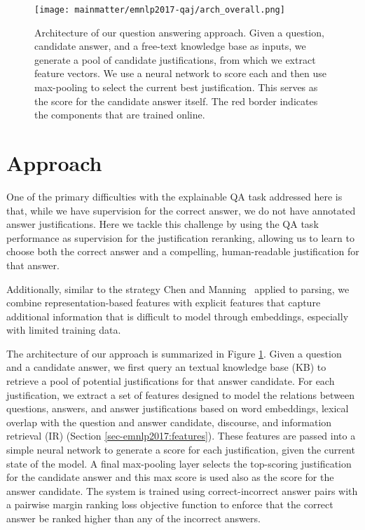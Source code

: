 
\begin{figure}[t]
\begin{center}
\texttt{[image: mainmatter/emnlp2017-qaj/arch\_overall.png]}
\caption{ Architecture of our question answering approach.  
Given a question, candidate answer, and a free-text knowledge base as inputs, we generate a pool of candidate justifications, from which we extract feature vectors.  We use a neural network to score each and then use max-pooling to select the current best justification. This serves as the score for the candidate answer itself.  The red border indicates the components that are trained online. }
\label{fig:arch_overall}
\end{center}
\end{figure}

\section{Approach}
\label{sec-emnlp2017:approach}
One of the primary difficulties with the explainable QA task addressed here is that, while we have supervision for the correct answer, we do not have annotated answer justifications.  
Here we tackle this challenge by using the QA task performance as supervision for the justification reranking, allowing us to 
learn to choose both the correct answer and a compelling, human-readable justification for that answer.

Additionally, similar to the strategy Chen and Manning~\citeyear{chen2014fast} applied to parsing, we combine representation-based features with explicit features that capture additional information that is difficult to model through embeddings, especially with limited training data.



The architecture of our approach is summarized in Figure \ref{fig:arch_overall}.  
Given a question and a candidate answer, we first query an textual knowledge base (KB) to retrieve a pool of potential justifications for that answer candidate.  
For each justification, we extract a set of features designed to model the relations between questions, answers, and answer justifications based on word embeddings, lexical overlap with the question and answer candidate, discourse, and information retrieval (IR) (Section \ref{sec-emnlp2017:features}).
These features are passed into a simple neural network to generate a score for each justification, given the current state of the model.  A final max-pooling layer selects the top-scoring justification for the candidate answer and this max score is used also as the score for the answer candidate.  
The system is trained using correct-incorrect answer pairs with a pairwise margin ranking loss objective function to enforce that the correct answer be ranked higher than any of the incorrect answers. 

